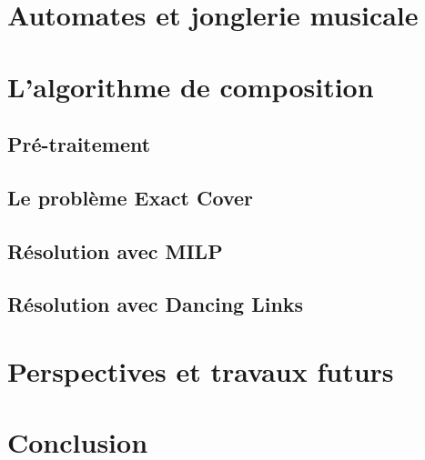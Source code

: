 \documentclass[a4paper]{easychair}
\begin{document}
\section{Automates et jonglerie musicale}

\section{L'algorithme de composition}
\subsection{Pré-traitement}
\subsection{Le problème Exact Cover}
\subsection{Résolution avec MILP}
\subsection{Résolution avec Dancing Links}

\section{Perspectives et travaux futurs}

\section{Conclusion}
\label{sec:conclusion}



\end{document}
